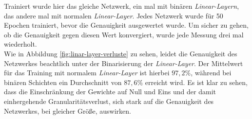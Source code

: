 Trainiert wurde hier das gleiche Netzwerk, ein mal mit binären \textit{Linear-Layern}, das andere mal mit normalen \textit{Linear-Layer}. Jedes Netzwerk wurde für 50 Epochen trainiert, bevor die Genauigkeit ausgewertet wurde. Um sicher zu gehen, ob die Genauigkeit gegen diesen Wert konvergiert, wurde jede Messung drei mal wiederholt.\\
Wie in Abbildung \ref{fig:linar-layer-verluste} zu sehen, leidet die Genauigkeit des Netzwerkes beachtlich unter der Binarisierung der \textit{Linear-Layer}. Der Mittelwert für das Training mit normalem \textit{Linear-Layer} ist hierbei $97,2\%$, während bei binären Schichten ein Durchschnitt von $87,6\%$ erreicht wird. Es ist klar zu sehen, dass die Einschränkung der Gewichte auf Null und Eins und der damit einhergehende Granularitätsverlust, sich stark auf die Genauigkeit des Netzwerkes, bei gleicher Größe, auswirken. 

